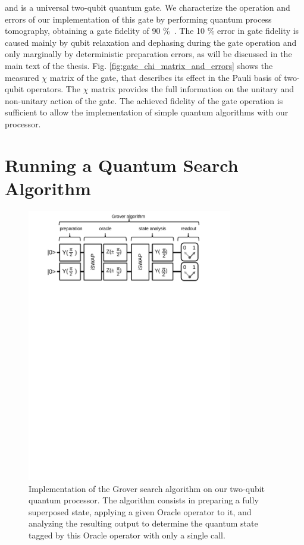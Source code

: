 and is a universal two-qubit quantum gate. We characterize the operation and errors of our implementation of this gate by performing quantum process tomography, obtaining a gate fidelity of 90 \%\ . The 10 \% error in gate fidelity is caused mainly by qubit relaxation and dephasing during the gate operation and only marginally by deterministic preparation errors, as will be discussed in the main text of the thesis. Fig. \ref{fig:gate_chi_matrix_and_errors} shows the measured $\chi$ matrix of the gate, that describes its effect in the Pauli basis of two-qubit operators. The $\chi$  matrix  provides  the full information on the unitary and non-unitary action of the gate. The achieved fidelity of the gate operation is sufficient to allow the implementation of   simple quantum algorithms with our processor.
 
\section{Running a Quantum Search Algorithm}

\begin{figure}[ht!]
	\centering
		\includegraphics[width=0.8\textwidth]{./material/papers/grover/figures/grover_algorithm_schematic}
	\caption[implementation of the Grover search algorithm]{Implementation of the Grover search algorithm on our two-qubit quantum processor. The algorithm consists in preparing a fully superposed state, applying a given Oracle operator to it, and analyzing the resulting output to determine the quantum state tagged by this Oracle operator with only a single call.} 
	\label{fig:grover_algorithm_schematic}
\end{figure}

